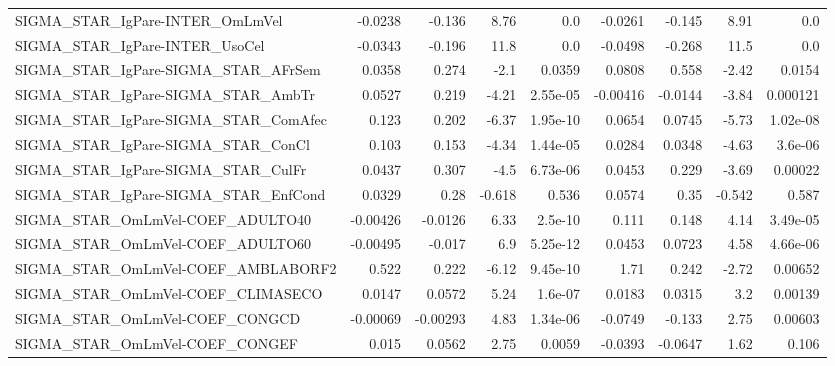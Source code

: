 \begin{tabular}{lrrrrrrrr}
SIGMA\_STAR\_IgPare-INTER\_OmLmVel       &     -0.0238 &       -0.136 &     8.76 &      0.0 &    -0.0261 &      -0.145 &         8.91 &           0.0 \\
SIGMA\_STAR\_IgPare-INTER\_UsoCel        &     -0.0343 &       -0.196 &     11.8 &      0.0 &    -0.0498 &      -0.268 &         11.5 &           0.0 \\
SIGMA\_STAR\_IgPare-SIGMA\_STAR\_AFrSem   &      0.0358 &        0.274 &     -2.1 &   0.0359 &     0.0808 &       0.558 &        -2.42 &        0.0154 \\
SIGMA\_STAR\_IgPare-SIGMA\_STAR\_AmbTr    &      0.0527 &        0.219 &    -4.21 & 2.55e-05 &   -0.00416 &     -0.0144 &        -3.84 &      0.000121 \\
SIGMA\_STAR\_IgPare-SIGMA\_STAR\_ComAfec  &       0.123 &        0.202 &    -6.37 & 1.95e-10 &     0.0654 &      0.0745 &        -5.73 &      1.02e-08 \\
SIGMA\_STAR\_IgPare-SIGMA\_STAR\_ConCl    &       0.103 &        0.153 &    -4.34 & 1.44e-05 &     0.0284 &      0.0348 &        -4.63 &       3.6e-06 \\
SIGMA\_STAR\_IgPare-SIGMA\_STAR\_CulFr    &      0.0437 &        0.307 &     -4.5 & 6.73e-06 &     0.0453 &       0.229 &        -3.69 &       0.00022 \\
SIGMA\_STAR\_IgPare-SIGMA\_STAR\_EnfCond  &      0.0329 &         0.28 &   -0.618 &    0.536 &     0.0574 &        0.35 &       -0.542 &         0.587 \\
SIGMA\_STAR\_OmLmVel-COEF\_ADULTO40      &    -0.00426 &      -0.0126 &     6.33 &  2.5e-10 &      0.111 &       0.148 &         4.14 &      3.49e-05 \\
SIGMA\_STAR\_OmLmVel-COEF\_ADULTO60      &    -0.00495 &       -0.017 &      6.9 & 5.25e-12 &     0.0453 &      0.0723 &         4.58 &      4.66e-06 \\
SIGMA\_STAR\_OmLmVel-COEF\_AMBLABORF2    &       0.522 &        0.222 &    -6.12 & 9.45e-10 &       1.71 &       0.242 &        -2.72 &       0.00652 \\
SIGMA\_STAR\_OmLmVel-COEF\_CLIMASECO     &      0.0147 &       0.0572 &     5.24 &  1.6e-07 &     0.0183 &      0.0315 &          3.2 &       0.00139 \\
SIGMA\_STAR\_OmLmVel-COEF\_CONGCD        &    -0.00069 &     -0.00293 &     4.83 & 1.34e-06 &    -0.0749 &      -0.133 &         2.75 &       0.00603 \\
SIGMA\_STAR\_OmLmVel-COEF\_CONGEF        &       0.015 &       0.0562 &     2.75 &   0.0059 &    -0.0393 &     -0.0647 &         1.62 &         0.106 \\

\end{tabular}
